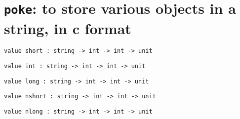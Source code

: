 \section{{\tt poke}:  to store various objects in a string, in c format}

%

\begin{comment}
 Arguments: the destination string, the offset into that string, and
   the object to poke. Result: none. 
\end{comment}
\begin{verbatim}
value short : string -> int -> int -> unit
\end{verbatim}
%
\begin{comment}
 A short 
\end{comment}
\begin{verbatim}
value int : string -> int -> int -> unit
\end{verbatim}
%
\begin{comment}
 An int 
\end{comment}
\begin{verbatim}
value long : string -> int -> int -> unit
\end{verbatim}
%
\begin{comment}
 A long 
\end{comment}
\begin{verbatim}
value nshort : string -> int -> int -> unit
\end{verbatim}
%
\begin{comment}
 An unsigned short in network byte order 
\end{comment}
\begin{verbatim}
value nlong : string -> int -> int -> unit
\end{verbatim}
%
\begin{comment}
 An unsigned long in network byte order 
\end{comment}
